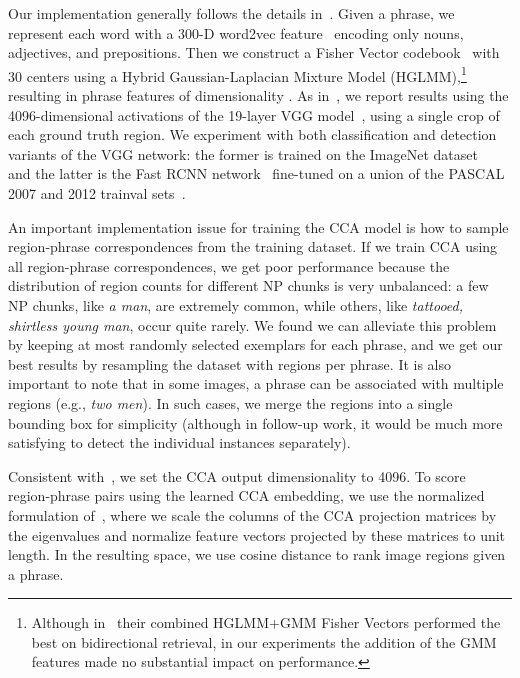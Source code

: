 \documentclass[twocolumn]{svjour3}
\begin{document}
Our implementation generally follows the details in~\cite{klein2014fisher}. Given a phrase, we represent each word with a 300-D word2vec feature~\citep{mikolov2013distributed} encoding only nouns, adjectives, and prepositions. Then we construct a Fisher Vector codebook~\citep{perronnin2010improving} with 30 centers using a Hybrid Gaussian-Laplacian Mixture Model (HGLMM),\footnote{Although in~\citet{klein2014fisher} their combined HGLMM+GMM Fisher Vectors performed the best on bidirectional retrieval, in our experiments the addition of the GMM features made no substantial impact on performance.} resulting in phrase features of dimensionality .   As in~\citet{klein2014fisher}, we report results using the 4096-dimensional activations of the 19-layer VGG model~\citep{simonyan2014very}, using a single crop of each ground truth region. We experiment with both classification and detection variants of the VGG network: the former is trained on the ImageNet dataset~\citep{deng2009imagenet} and the latter is the Fast RCNN network~\citep{girshickICCV15fastrcnn} fine-tuned on a union of the PASCAL 2007 and 2012 trainval sets~\citep{pascal-voc-2012}.  

An important implementation issue for training the CCA model is how to sample region-phrase correspondences from the training dataset. If we train CCA using all region-phrase correspondences, we get poor performance because the distribution of region counts for different NP chunks is very unbalanced: a few NP chunks, like {\em a man}, are extremely common, while others, like {\em tattooed, shirtless young man}, occur quite rarely. We found we can alleviate this problem by keeping at most  randomly selected exemplars for each phrase, and we get our best results by resampling the dataset with  regions per phrase. It is also important to note that in some images, a phrase can be associated with multiple regions (e.g., {\em two men}). In such cases, we merge the regions into a single bounding box for simplicity (although in follow-up work, it would be much more satisfying to detect the individual instances separately). 

Consistent with~\cite{klein2014fisher}, we set the CCA output dimensionality to 4096. To score region-phrase pairs using the learned CCA embedding, we use the normalized formulation of~\citet{Gong2014}, where we scale the columns of the CCA projection matrices by the eigenvalues and normalize feature vectors projected by these matrices to unit length. In the resulting space, we use cosine distance to rank image regions given a phrase.
\end{document}
